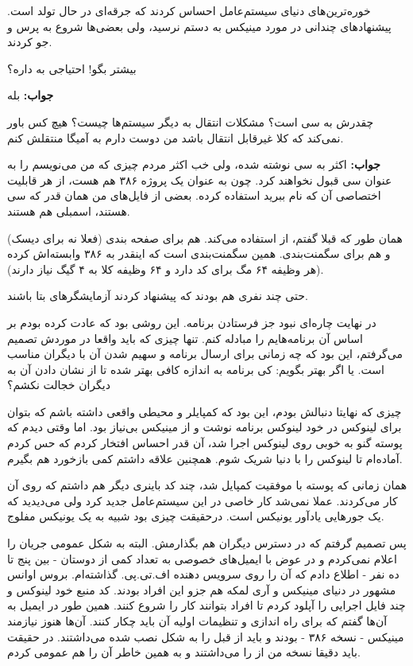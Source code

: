 خوره‌ترین‌های دنیای سیستم‌عامل احساس کردند که جرقه‌ای در حال تولد
است. پیشنهادهای چندانی در مورد مینیکس به دستم نرسید، ولی بعضی‌ها شروع
به پرس و جو کردند.

\begin{emailbox}
\noindent\textbf{\code{<}} بیشتر بگو! احتیاجی به  داره؟

\noindent\textbf{جواب:} بله

\noindent\textbf{\code{<}} چقدرش به سی است؟ مشکلات انتقال به دیگر
سیستم‌ها چیست؟ هیچ کس باور نمی‌کند که کلا غیرقابل انتقال باشد \code{):} من دوست
دارم به آمیگا منتقلش کنم.

\noindent\textbf{جواب:} اکثر به سی نوشته شده، ولی خب اکثر مردم چیزی که
من می‌نویسم را به عنوان سی قبول نخواهند کرد. چون به عنوان یک پروژه ۳۸۶
هم هست، از هر قابلیت اختصاصی آن که نام ببرید استفاده کرده. بعضی از
فایل‌های  من همان قدر که سی هستند، اسمبلی هم هستند.

\noindent همان طور که قبلا گفتم، از  استفاده می‌کند. هم برای
صفحه بندی (فعلا نه برای دیسک) و هم برای سگمنت‌بندی. همین سگمنت‌بندی است
که اینقدر به ۳۸۶ وابسته‌اش کرده (هر وظیفه ۶۴ مگ برای کد دارد و ۶۴ وظیفه
کلا به ۴ گیگ نیاز دارند).
\end{emailbox}


حتی چند نفری هم بودند که پیشنهاد کردند آزمایشگرهای بتا باشند. 

در نهایت چاره‌ای نبود جز فرستادن برنامه. این روشی بود که عادت کرده بودم
بر اساس آن برنامه‌هایم را مبادله کنم. تنها چیزی که باید واقعا در موردش
تصمیم می‌گرفتم، این بود که چه زمانی برای ارسال برنامه و سهیم شدن آن با
دیگران مناسب است. یا اگر بهتر بگویم: کی برنامه به اندازه کافی بهتر شده
تا از نشان دادن آن به دیگران خجالت نکشم؟

چیزی که نهایتا دنبالش بودم، این بود که کمپایلر و محیطی واقعی داشته
باشم که بتوان برای لینوکس در خود لینوکس برنامه نوشت و از مینیکس بی‌نیاز
بود. اما وقتی دیدم که پوسته گنو به خوبی روی لینوکس اجرا شد، آن قدر
احساس افتخار کردم که حس کردم آماده‌ام تا لینوکس را با دنیا شریک
شوم. همچنین علاقه داشتم کمی بازخورد هم بگیرم.

همان زمانی که پوسته با موفقیت کمپایل شد، چند کد باینری دیگر هم داشتم
که روی آن کار می‌کردند. عملا نمی‌شد کار خاصی در این سیستم‌عامل جدید کرد
ولی می‌دیدید که یک جورهایی یادآور یونیکس است. درحقیقت چیزی بود شبیه به
یک یونیکس مفلوج.

پس تصمیم گرفتم که در دسترس دیگران هم بگذارمش. البته به شکل عمومی جریان
را اعلام نمی‌کردم و در عوض با ایمیل‌های خصوصی به تعداد کمی از دوستان -
بین پنج تا ده نفر - اطلاع دادم که آن را روی سرویس دهنده
اف.تی.پی. گذاشته‌ام. بروس اوانس مشهور در دنیای مینیکس و آری لمکه هم جزو
این افراد بودند. کد منبع خود لینوکس و چند فایل اجرایی را آپلود کردم تا
افراد بتوانند کار را شروع کنند. همین طور در ایمیل به آن‌ها گفتم که برای
راه اندازی و تنظیمات اولیه آن باید چکار کنند. آن‌ها هنوز نیازمند مینیکس
- نسخه ۳۸۶ - بودند و باید از قبل  را به شکل نصب شده می‌داشتند. در
حقیقت باید دقیقا نسخه من از  را می‌داشتند و به همین خاطر آن را هم
عمومی کردم.


